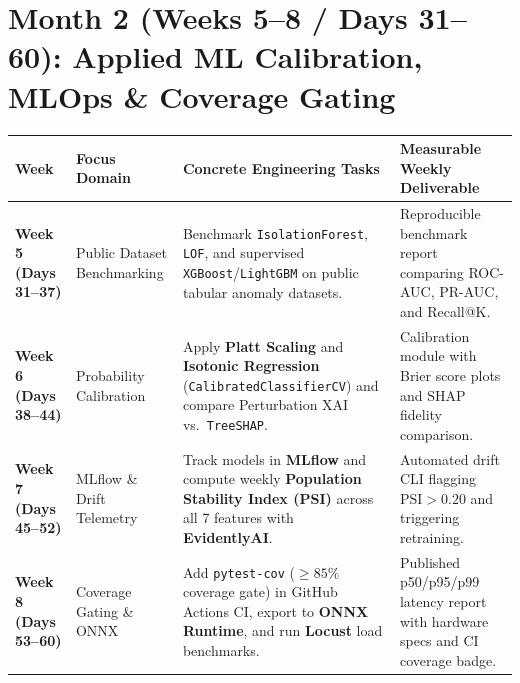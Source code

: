 \documentclass[a4paper,10pt]{article}
\begin{document}
\section{Month 2 (Weeks 5--8 / Days 31--60): Applied ML Calibration, MLOps \& Coverage Gating}
\begin{tabularx}{\textwidth}{@{}p{1.05in}p{1.55in}p{2.25in}X@{}}
\toprule
\textbf{Week} & \textbf{Focus Domain} & \textbf{Concrete Engineering Tasks} & \textbf{Measurable Weekly Deliverable} \\
\midrule
\textbf{Week 5 (Days 31--37)} & Public Dataset Benchmarking & Benchmark \texttt{IsolationForest}, \texttt{LOF}, and supervised \texttt{XGBoost}/\texttt{LightGBM} on public tabular anomaly datasets. & Reproducible benchmark report comparing ROC-AUC, PR-AUC, and Recall@K. \\
\addlinespace[4pt]
\textbf{Week 6 (Days 38--44)} & Probability Calibration & Apply \textbf{Platt Scaling} and \textbf{Isotonic Regression} (\texttt{CalibratedClassifierCV}) and compare Perturbation XAI vs.\ \texttt{TreeSHAP}. & Calibration module with Brier score plots and SHAP fidelity comparison. \\
\addlinespace[4pt]
\textbf{Week 7 (Days 45--52)} & MLflow \& Drift Telemetry & Track models in \textbf{MLflow} and compute weekly \textbf{Population Stability Index (PSI)} across all 7 features with \textbf{EvidentlyAI}. & Automated drift CLI flagging $\text{PSI} > 0.20$ and triggering retraining. \\
\addlinespace[4pt]
\textbf{Week 8 (Days 53--60)} & Coverage Gating \& ONNX & Add \texttt{pytest-cov} ($\ge 85\%$ coverage gate) in GitHub Actions CI, export to \textbf{ONNX Runtime}, and run \textbf{Locust} load benchmarks. & Published p50/p95/p99 latency report with hardware specs and CI coverage badge. \\
\bottomrule
\end{tabularx}

\newpage
\end{document}
